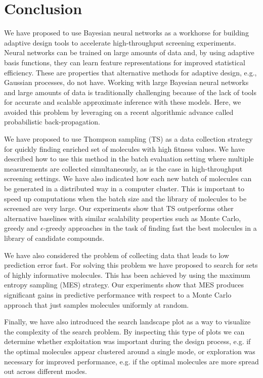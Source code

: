 \section{Conclusion}

We have proposed to use Bayesian neural networks as a workhorse for building adaptive design tools to accelerate high-throughput screening experiments. Neural networks can be trained on large amounts of data and, by using adaptive basis functions, they can learn feature representations for improved statistical efficiency. These are properties that alternative methods for adaptive design, e.g., Gaussian processes, do not have. Working with large Bayesian neural networks and large amounts of data is traditionally challenging because of the lack of tools for accurate and scalable approximate inference with these models. Here, we avoided this problem by leveraging on a recent algorithmic advance called probabilistic back-propagation.

We have proposed to use Thompson sampling (TS) as a data collection strategy for quickly finding enriched set of molecules with high fitness values. We have described how to use this method in the batch evaluation setting where multiple measurements are collected simultaneously, as is the case in high-throughput screening settings. We have also indicated how each new batch of molecules can be generated in a distributed way in a computer cluster. This is important to speed up computations when the batch size and the library of molecules to be screened are very large. Our experiments show that TS outperforms other alternative baselines with similar scalability properties such as Monte Carlo, greedy and $\epsilon$-greedy approaches in the task of finding fast the best molecules in a library of candidate compounds.

We have also considered the problem of collecting data that leads to low prediction error fast. For solving this problem we have proposed to search for sets of highly informative molecules. This has been achieved by using the maximum entropy sampling (MES) strategy. Our experiments show that MES produces significant gains in predictive performance with respect to a Monte Carlo approach that just samples molecules uniformly at random.

Finally, we have also introduced the search landscape plot as a way to visualize the complexity of the search problem. By inspecting this type of plots we can determine whether exploitation was important during the design process, e.g. if the optimal molecules appear clustered around a single mode, or exploration was necessary for improved performance, e.g. if the optimal molecules are more spread out across different modes.